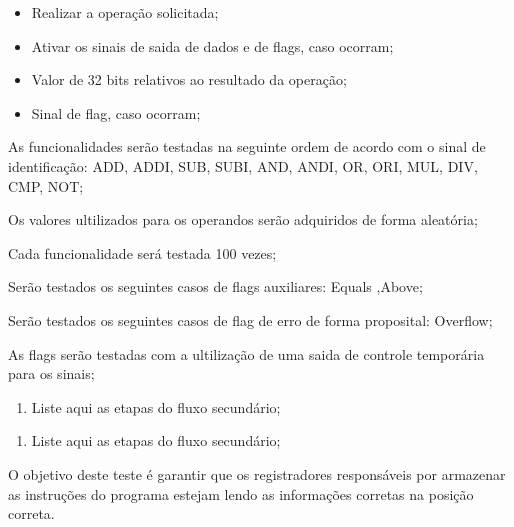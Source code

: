 \documentclass{article}
\begin{document}
  \actions
  \begin{itemize}
     \item Realizar a operação solicitada;
     \item Ativar os sinais de saida de dados e de flags, caso ocorram;
    \end{itemize}
  
  \results
  	\begin{itemize}
     \item Valor de 32 bits relativos ao resultado da operação;
     \item Sinal de flag, caso ocorram;
    \end{itemize}
  
  \begin{mainflow}
    \item As funcionalidades serão testadas na seguinte ordem de acordo com o sinal de identificação: ADD, ADDI, SUB, SUBI,
AND, ANDI, OR, ORI, MUL, DIV, CMP, NOT;
    \item Os valores ultilizados para os operandos serão adquiridos de forma aleatória;
    \item Cada funcionalidade será testada 100 vezes;
    \item Serão testados os seguintes casos de flags auxiliares: Equals ,Above;
    \item Serão testados os seguintes casos de flag de erro de forma proposital: Overflow;
    \item As flags serão testadas com a ultilização de uma saida de controle temporária para os sinais;
  \end{mainflow}
  
  \begin{secondaryflow} 
    \begin{enumerate}
      \item Liste aqui as etapas do fluxo secundário;
    \end{enumerate}
    \begin{enumerate}
      \item Liste aqui as etapas do fluxo secundário;
    \end{enumerate}
  \end{secondaryflow}  
  
  
  
O objetivo deste teste é garantir que os registradores responsáveis por armazenar as instruções do programa  estejam lendo as informações corretas na posição correta.
  
\end{document}
